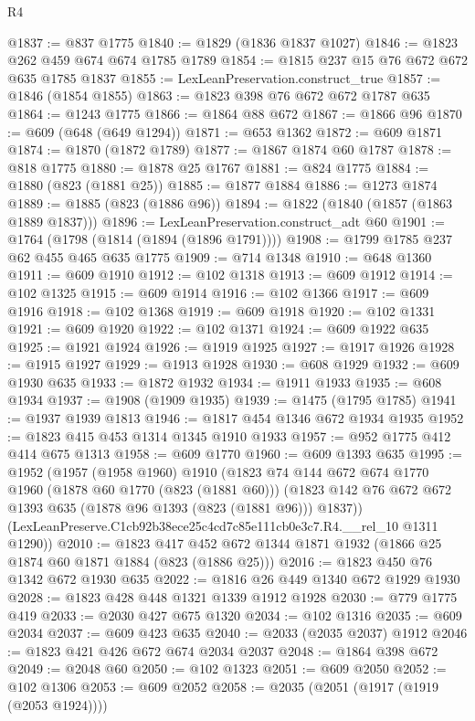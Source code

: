\begin{lexlean}{R4}
\begin{coremodule}
@1837 := @837 @1775
@1840 := @1829 (@1836 @1837 @1027)
@1846 := @1823 @262 @459 @674 @674 @1785 @1789
@1854 := @1815 @237 @15 @76 @672 @672 @635 @1785 @1837
@1855 := LexLeanPreservation.construct_true
@1857 := @1846 (@1854 @1855)
@1863 := @1823 @398 @76 @672 @672 @1787 @635
@1864 := @1243 @1775
@1866 := @1864 @88 @672
@1867 := @1866 @96
@1870 := @609 (@648 (@649 @1294))
@1871 := @653 @1362
@1872 := @609 @1871
@1874 := @1870 (@1872 @1789)
@1877 := @1867 @1874 @60 @1787
@1878 := @818 @1775
@1880 := @1878 @25 @1767
@1881 := @824 @1775
@1884 := @1880 (@823 (@1881 @25))
@1885 := @1877 @1884
@1886 := @1273 @1874
@1889 := @1885 (@823 (@1886 @96))
@1894 := @1822 (@1840 (@1857 (@1863 @1889 @1837)))
@1896 := LexLeanPreservation.construct_adt @60
@1901 := @1764 (@1798 (@1814 (@1894 (@1896 @1791))))
@1908 := @1799 @1785 @237 @62 @455 @465 @635 @1775
@1909 := @714 @1348
@1910 := @648 @1360
@1911 := @609 @1910
@1912 := @102 @1318
@1913 := @609 @1912
@1914 := @102 @1325
@1915 := @609 @1914
@1916 := @102 @1366
@1917 := @609 @1916
@1918 := @102 @1368
@1919 := @609 @1918
@1920 := @102 @1331
@1921 := @609 @1920
@1922 := @102 @1371
@1924 := @609 @1922 @635
@1925 := @1921 @1924
@1926 := @1919 @1925
@1927 := @1917 @1926
@1928 := @1915 @1927
@1929 := @1913 @1928
@1930 := @608 @1929
@1932 := @609 @1930 @635
@1933 := @1872 @1932
@1934 := @1911 @1933
@1935 := @608 @1934
@1937 := @1908 (@1909 @1935)
@1939 := @1475 (@1795 @1785)
@1941 := @1937 @1939 @1813
@1946 := @1817 @454 @1346 @672 @1934 @1935
@1952 := @1823 @415 @453 @1314 @1345 @1910 @1933
@1957 := @952 @1775 @412 @414 @675 @1313
@1958 := @609 @1770
@1960 := @609 @1393 @635
@1995 := @1952
    (@1957
      (@1958 @1960)
      @1910
      (@1823
        @74
        @144
        @672
        @674
        @1770
        @1960
        (@1878 @60 @1770 (@823 (@1881 @60)))
        (@1823 @142 @76 @672 @672 @1393 @635 (@1878 @96 @1393 (@823 (@1881 @96))) @1837))
      (LexLeanPreserve.C1cb92b38ece25c4cd7c85e111cb0e3c7.R4.__rel_10 @1311 @1290))
@2010 := @1823 @417 @452 @672 @1344 @1871 @1932 (@1866 @25 @1874 @60 @1871 @1884 (@823 (@1886 @25)))
@2016 := @1823 @450 @76 @1342 @672 @1930 @635
@2022 := @1816 @26 @449 @1340 @672 @1929 @1930
@2028 := @1823 @428 @448 @1321 @1339 @1912 @1928
@2030 := @779 @1775 @419
@2033 := @2030 @427 @675 @1320
@2034 := @102 @1316
@2035 := @609 @2034
@2037 := @609 @423 @635
@2040 := @2033 (@2035 @2037) @1912
@2046 := @1823 @421 @426 @672 @674 @2034 @2037
@2048 := @1864 @398 @672
@2049 := @2048 @60
@2050 := @102 @1323
@2051 := @609 @2050
@2052 := @102 @1306
@2053 := @609 @2052
@2058 := @2035 (@2051 (@1917 (@1919 (@2053 @1924))))

\end{coremodule}
\end{lexlean}

